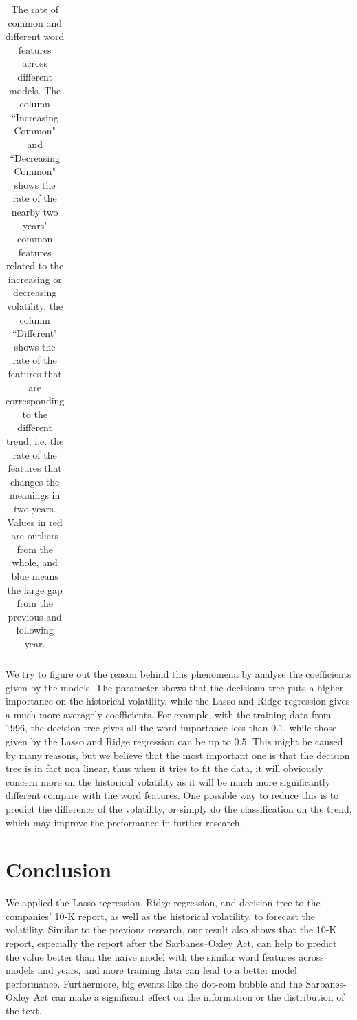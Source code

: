 \documentclass[11pt]{article}
\begin{document}
{\begin{table}[p]
\begin{tabular}{|c|c|c|c|c|}
      \hline
    \end{tabular}
    \caption{The rate of common and different word features across different models. The column ``Increasing Common" and ``Decreasing Common" shows the rate of the nearby two years' common features related to the increasing or decreasing volatility, the column ``Different" shows the rate of the features that are corresponding to the different trend, i.e. the rate of the features that changes the meanings in two years. Values in red are outliers from the whole, and blue means the large gap from the previous and following year.}
    \label{table-words-feature-model}
  \end{table}
}

We try to figure out the reason behind this phenomena by analyse the coefficients  given by the models. The parameter shows that the decisionn tree puts a higher importance on the historical volatility, while the Lasso and Ridge regression gives a much more averagely coefficients. For example, with the training data from 1996, the decision tree gives all the word importance less than $0.1$, while those given by the Lasso and Ridge regression can be up to $0.5$. This might be caused by many reasons, but we believe that the most important one is that the decision tree is in fact non linear, thus when it tries to fit the data, it will obviously concern more on the historical volatility as it will be much more significantly different compare with the word features. One possible way to reduce this is to predict the difference of the volatility, or simply do the classification on the trend, which may improve the preformance in further research.

\section{Conclusion}

We applied the Lasso regression, Ridge regression, and decision tree to the companies' 10-K report, as well as the historical volatility, to forecast the volatility. Similar to the previous research\cite{kogan2009predicting}, our result also shows that the 10-K report, especially the report after the Sarbanes–Oxley Act, can help to predict the value better than the naive model with the similar word features across models and years, and more training data can lead to a better model performance. Furthermore, big events like the dot-com bubble and the Sarbanes-Oxley Act can make a significant effect on the information or the distribution of the text.
\end{document}
